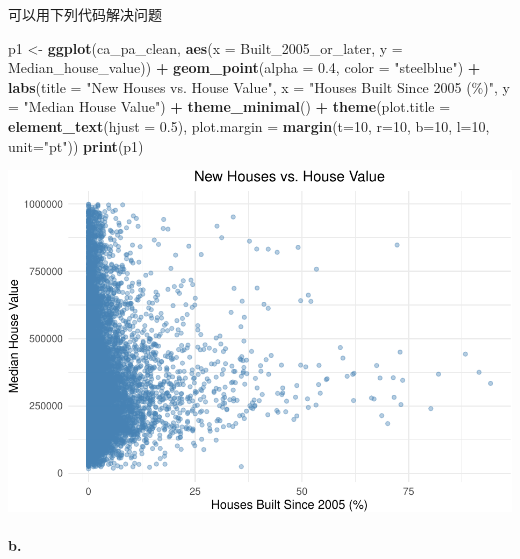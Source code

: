 \documentclass[
]{article}
\newenvironment{Shaded}{\begin{snugshade}}{\end{snugshade}}
\newcommand{\AttributeTok}[1]{\textcolor[rgb]{0.13,0.29,0.53}{#1}}
\newcommand{\DecValTok}[1]{\textcolor[rgb]{0.00,0.00,0.81}{#1}}
\newcommand{\FloatTok}[1]{\textcolor[rgb]{0.00,0.00,0.81}{#1}}
\newcommand{\FunctionTok}[1]{\textcolor[rgb]{0.13,0.29,0.53}{\textbf{#1}}}
\newcommand{\NormalTok}[1]{#1}
\newcommand{\OtherTok}[1]{\textcolor[rgb]{0.56,0.35,0.01}{#1}}
\newcommand{\SpecialCharTok}[1]{\textcolor[rgb]{0.81,0.36,0.00}{\textbf{#1}}}
\newcommand{\StringTok}[1]{\textcolor[rgb]{0.31,0.60,0.02}{#1}}
\begin{document}
可以用下列代码解决问题

\begin{Shaded}
\begin{Highlighting}[]
\NormalTok{p1 }\OtherTok{\textless{}{-}} \FunctionTok{ggplot}\NormalTok{(ca\_pa\_clean, }\FunctionTok{aes}\NormalTok{(}\AttributeTok{x =}\NormalTok{ Built\_2005\_or\_later, }\AttributeTok{y =}\NormalTok{ Median\_house\_value)) }\SpecialCharTok{+}
  \FunctionTok{geom\_point}\NormalTok{(}\AttributeTok{alpha =} \FloatTok{0.4}\NormalTok{, }\AttributeTok{color =} \StringTok{"steelblue"}\NormalTok{) }\SpecialCharTok{+}
  \FunctionTok{labs}\NormalTok{(}\AttributeTok{title =} \StringTok{"New Houses vs. House Value"}\NormalTok{,}
       \AttributeTok{x =} \StringTok{"Houses Built Since 2005 (\%)"}\NormalTok{, }
       \AttributeTok{y =} \StringTok{"Median House Value"}\NormalTok{) }\SpecialCharTok{+}
  \FunctionTok{theme\_minimal}\NormalTok{() }\SpecialCharTok{+}
  \FunctionTok{theme}\NormalTok{(}\AttributeTok{plot.title =} \FunctionTok{element\_text}\NormalTok{(}\AttributeTok{hjust =} \FloatTok{0.5}\NormalTok{),}
        \AttributeTok{plot.margin =} \FunctionTok{margin}\NormalTok{(}\AttributeTok{t=}\DecValTok{10}\NormalTok{, }\AttributeTok{r=}\DecValTok{10}\NormalTok{, }\AttributeTok{b=}\DecValTok{10}\NormalTok{, }\AttributeTok{l=}\DecValTok{10}\NormalTok{, }\AttributeTok{unit=}\StringTok{"pt"}\NormalTok{))}
\FunctionTok{print}\NormalTok{(p1)}
\end{Highlighting}
\end{Shaded}

\includegraphics{Homework-02_files/figure-latex/unnamed-chunk-6-1.pdf}

\paragraph{b.}\label{b.-1}
\end{document}
